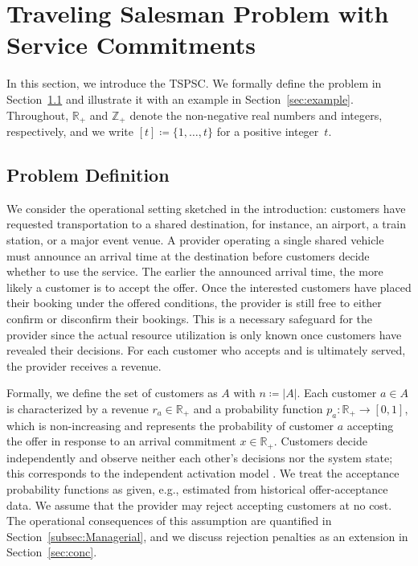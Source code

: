 \documentclass[11pt]{article}
\theoremstyle{plain}
\theoremstyle{definition}
\begin{document}
	\section{Traveling Salesman Problem with Service Commitments}
	\label{sec:problemDef}
	In this section, we introduce the \ac{TSPSC}. We formally define the problem in Section~\ref{sec:formalDef} and illustrate it with an example in Section~\ref{sec:example}. Throughout, $\mathbb{R}_+$ and $\mathbb{Z}_+$ denote the non-negative real numbers and integers, respectively, and we write $[t] \coloneqq \{1, \dots, t\}$ for a positive integer~$t$.
	
	\subsection{Problem Definition}\label{sec:formalDef}
	We consider the operational setting sketched in the introduction: customers have requested transportation to a shared destination, for instance, an airport, a train station, or a major event venue. A provider operating a single shared vehicle must announce an arrival time at the destination before customers decide whether to use the service. The earlier the announced arrival time, the more likely a customer is to accept the offer. Once the interested customers have placed their booking under the offered conditions, the provider is still free to either confirm or disconfirm their bookings. This is a necessary safeguard for the provider since the actual resource utilization is only known once customers have revealed their decisions. For each customer who accepts and is ultimately served, the provider receives a revenue.
	
	Formally, we define the set of customers as $A$ with $n \coloneqq |A|$. Each customer $a \in A$ is characterized by a revenue $r_a \in \mathbb{R}_+$ and a probability function $p_a \colon \mathbb{R}_+ \to [0,1]$, which is non-increasing and represents the probability of customer $a$ accepting the offer in response to an arrival commitment $x \in \mathbb{R}_+$. Customers decide independently and observe neither each other's decisions nor the system state; this corresponds to the independent activation model \citep[see, e.g.,][]{shmoys2008constant}. We treat the acceptance probability functions as given, e.g., estimated from historical offer-acceptance data. We assume that the provider may reject accepting customers at no cost. The operational consequences of this assumption are quantified in Section~\ref{subsec:Managerial}, and we discuss rejection penalties as an extension in Section~\ref{sec:conc}.
	
\end{document}

